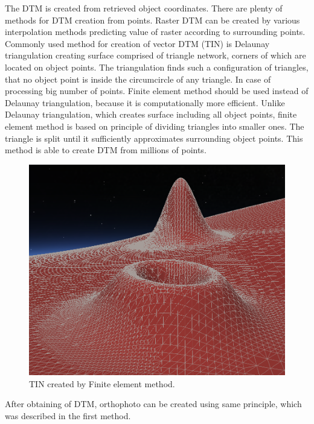 \documentclass[a4paper,12pt]{article}
\begin{document}
The DTM is created from retrieved object coordinates. There 
are plenty of methods for DTM creation from points. Raster DTM can be created by various interpolation methods 
predicting value of raster according to surrounding points. Commonly used method for  creation of 
vector DTM (TIN) is Delaunay triangulation creating surface comprised of triangle network, corners of which are located 
on object points. The triangulation finds such a configuration of triangles, that no object 
point is inside the circumcircle of any triangle.
In case of processing big number of points. Finite element method 
should be used instead of Delaunay triangulation, because it is computationally more efficient.
Unlike Delaunay triangulation, which creates surface including all object points, finite element method
is based on principle of dividing triangles into smaller ones. 
The triangle is split until it sufficiently approximates surrounding object points. 
This method is able to create DTM from millions of points.

\begin{figure}[h]
    \centering
    \includegraphics[scale=0.2]{figures/finite_elements.png}
    \caption{TIN created by Finite element method.}
    \label{fig:rel_or_amb}
\end{figure}

After obtaining of DTM, orthophoto can be created using same principle, which was described in the first method. 

\end{document}
